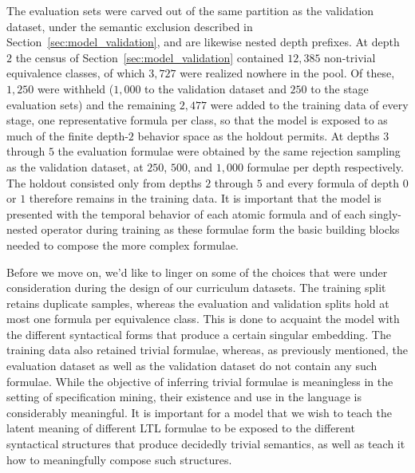 \documentclass[titlepage,a4paper,11pt]{report}
\begin{document}
    The evaluation sets were carved out of the same partition as the validation dataset, under the semantic exclusion described in Section~\ref{sec:model_validation}, and are likewise nested depth prefixes. At depth $2$ the census of Section~\ref{sec:model_validation} contained $12{,}385$ non-trivial equivalence classes, of which $3{,}727$ were realized nowhere in the pool. Of these, $1{,}250$ were withheld ($1{,}000$ to the validation dataset and $250$ to the stage evaluation sets) and the remaining $2{,}477$ were added to the training data of every stage, one representative formula per class, so that the model is exposed to as much of the finite depth-$2$ behavior space as the holdout permits. At depths $3$ through $5$ the evaluation formulae were obtained by the same rejection sampling as the validation dataset, at $250$, $500$, and $1{,}000$ formulae per depth respectively. The holdout consisted only from depths $2$ through $5$ and every formula of depth $0$ or $1$ therefore remains in the training data. It is important that the model is presented with the temporal behavior of each atomic formula and of each singly-nested operator during training as these formulae form the basic building blocks needed to compose the more complex formulae.
    
    Before we move on, we'd like to linger on some of the choices that were under consideration during the design of our curriculum datasets. The training split retains duplicate samples, whereas the evaluation and validation splits hold at most one formula per equivalence class. This is done to acquaint the model with the different syntactical forms that produce a certain singular embedding. The training data also retained trivial formulae, whereas, as previously mentioned, the evaluation dataset as well as the validation dataset do not contain any such formulae. While the objective of inferring trivial formulae is meaningless in the setting of specification mining, their existence and use in the language is considerably meaningful. It is important for a model that we wish to teach the latent meaning of different LTL formulae to be exposed to the different syntactical structures that produce decidedly trivial semantics, as well as teach it how to meaningfully compose such structures.
    
\end{document}
